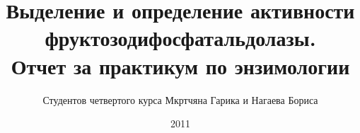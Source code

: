 \documentclass[a4paper,titlepage,12pt]{article}
\title{Выделение и определение активности фруктозодифосфатальдолазы.\\
    Отчет за практикум по энзимологии}
\author{Студентов четвертого курса
    Мкртчяна Гарика и Нагаева Бориса}
\date{2011}
\begin{document}
\maketitle
\thispagestyle{empty}

\begin{abstract}

\end{abstract}

\setcounter{page}{3}

\tableofcontents
\newpage








\end{document}
